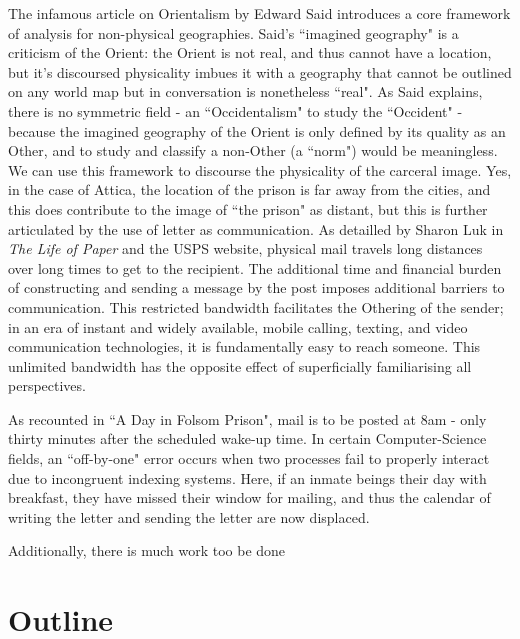 \documentclass[14pt, letterpaper]{report}
\begin{document}
    The infamous article on Orientalism by Edward Said \autocite{said-orientalism} 
    introduces a core framework of analysis for non-physical geographies. Said's 
    ``imagined geography" is a criticism of the Orient: the Orient is not real, 
    and thus cannot have a location, but it's discoursed physicality imbues it with 
    a geography that cannot be outlined on any world map but in conversation is 
    nonetheless ``real". As Said explains, there is no symmetric field - an ``Occidentalism" 
    to study the ``Occident" - because the imagined geography of the Orient is only 
    defined by its quality as an Other, and to study and classify a non-Other (a ``norm") 
    would be meaningless. \autocite[163]{said-orientalism} We can use this framework to 
    discourse the physicality of the carceral image. Yes, in the case of Attica, the 
    location of the prison is far away from the cities, and this does contribute to 
    the image of ``the prison" as distant, but this is further articulated by the 
    use of letter as communication. As detailled by Sharon Luk in \textit{The Life 
    of Paper} and the USPS website, physical mail travels long distances over long 
    times to get to the recipient. The additional time and financial burden of 
    constructing and sending a message by the post imposes additional barriers to 
    communication. This restricted bandwidth facilitates the Othering of the sender; 
    in an era of instant and widely available, mobile calling, texting, and video 
    communication technologies, it is fundamentally easy to reach someone. This 
    unlimited bandwidth has the opposite effect of superficially familiarising all 
    perspectives. 
    
    As recounted in ``A Day in Folsom Prison", mail is to be posted at 8am - only 
    thirty minutes after the scheduled wake-up time. In certain Computer-Science 
    fields, an ``off-by-one" error occurs when two processes fail to properly 
    interact due to incongruent indexing systems. Here, if an inmate beings their
    day with breakfast, they have missed their window for mailing, and thus the 
    calendar of writing the letter and sending the letter are now displaced. 
    
    Additionally, there is much work too be done 
	
   \section*{Outline}
	
\end{document}
